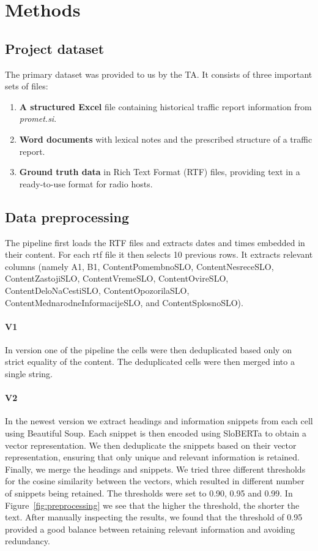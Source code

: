 \documentclass[fleqn,moreauthors,10pt]{ds_report}
\begin{document}
\section{Methods}

\subsection*{Project dataset}

The primary dataset was provided to us by the TA. It consists of three important sets of files:

\begin{enumerate}
    \item \textbf{A structured Excel} file containing historical traffic report information from \textit{promet.si}.
    \item \textbf{Word documents} with lexical notes and the prescribed structure of a traffic report.
    \item \textbf{Ground truth data} in Rich Text Format (RTF) files, providing text in a ready-to-use format for radio hosts.
\end{enumerate}


\subsection*{Data preprocessing}


The pipeline first loads the RTF files and extracts dates and times embedded in their content. For each rtf file it then selects 10 previous rows. It extracts relevant columns (namely A1, B1, ContentPomembnoSLO, ContentNesreceSLO, ContentZastojiSLO, ContentVremeSLO, ContentOvireSLO, ContentDeloNaCestiSLO, ContentOpozorilaSLO, ContentMednarodneInformacijeSLO, and ContentSplosnoSLO).

\paragraph{V1}
In version one of the pipeline the cells were then deduplicated based only on strict equality of the content. The deduplicated cells were then merged into a single string.

\paragraph{V2}
In the newest version we extract headings and information snippets from each cell using Beautiful Soup. Each snippet is then encoded using SloBERTa \cite{SloBERTa} to obtain a vector representation. We then deduplicate the snippets based on their vector representation, ensuring that only unique and relevant information is retained. Finally, we merge the headings and snippets.
We tried three different thresholds for the cosine similarity between the vectors, which resulted in different number of snippets being retained. The thresholds were set to 0.90, 0.95 and 0.99. In Figure~\ref{fig:preprocessing} we see that the higher the threshold, the shorter the text. After manually inspecting the results, we found that the threshold of 0.95 provided a good balance between retaining relevant information and avoiding redundancy.
\end{document}
